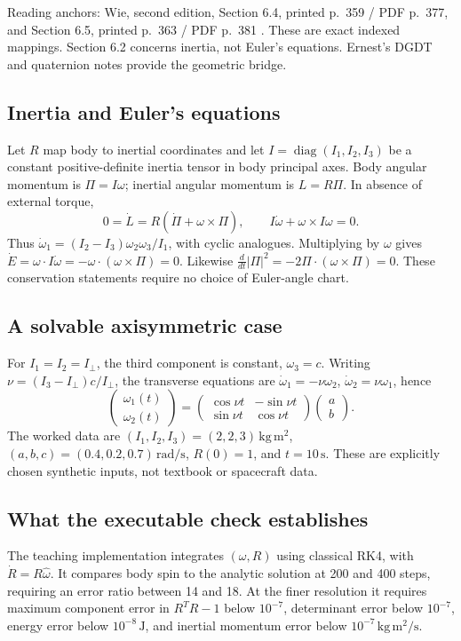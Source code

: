 Reading anchors: Wie, second edition, Section 6.4, printed p.~359 / PDF
p.~377, and Section 6.5, printed p.~363 / PDF p.~381 \cite{wie}.
These are exact indexed mappings. Section 6.2 concerns inertia, not Euler's
equations. Ernest's DGDT and quaternion notes provide the geometric bridge.

\subsection{Inertia and Euler's equations}
Let $R$ map body to inertial coordinates and let
$I=\operatorname{diag}(I_1,I_2,I_3)$ be a constant positive-definite inertia
tensor in body principal axes. Body angular momentum is $\Pi=I\omega$;
inertial angular momentum is $L=R\Pi$. In absence of external torque,
\[
 0=\dot L=R(\dot\Pi+\omega\times\Pi),\qquad
 I\dot\omega+\omega\times I\omega=0.
\]
Thus $\dot\omega_1=(I_2-I_3)\omega_2\omega_3/I_1$, with cyclic analogues.
Multiplying by $\omega$ gives
$\dot E=\omega\cdot I\dot\omega=-\omega\cdot(\omega\times\Pi)=0$.
Likewise $\tfrac{d}{dt}|\Pi|^2=-2\Pi\cdot(\omega\times\Pi)=0$.
These conservation statements require no choice of Euler-angle chart.

\subsection{A solvable axisymmetric case}
For $I_1=I_2=I_\perp$, the third component is constant, $\omega_3=c$.
Writing $\nu=(I_3-I_\perp)c/I_\perp$, the transverse equations are
$\dot\omega_1=-\nu\omega_2$, $\dot\omega_2=\nu\omega_1$, hence
\[
 \begin{pmatrix}\omega_1(t)\\\omega_2(t)\end{pmatrix}
 =\begin{pmatrix}\cos\nu t&-\sin\nu t\\\sin\nu t&\cos\nu t\end{pmatrix}
 \begin{pmatrix}a\\b\end{pmatrix}.
\]
The worked data are $(I_1,I_2,I_3)=(2,2,3)\,\mathrm{kg\,m^2}$,
$(a,b,c)=(0.4,0.2,0.7)\,\mathrm{rad/s}$, $R(0)=1$, and $t=10\,\mathrm{s}$.
These are explicitly chosen synthetic inputs, not textbook or spacecraft data.

\subsection{What the executable check establishes}
The teaching implementation integrates $(\omega,R)$ using classical RK4,
with $\dot R=R\widehat\omega$. It compares body spin to the analytic solution
at 200 and 400 steps, requiring an error ratio between 14 and 18.
At the finer resolution it requires maximum component error in $R^TR-1$
below $10^{-7}$, determinant error below $10^{-7}$, energy error below
$10^{-8}\,\mathrm{J}$, and inertial momentum error below
$10^{-7}\,\mathrm{kg\,m^2/s}$.

